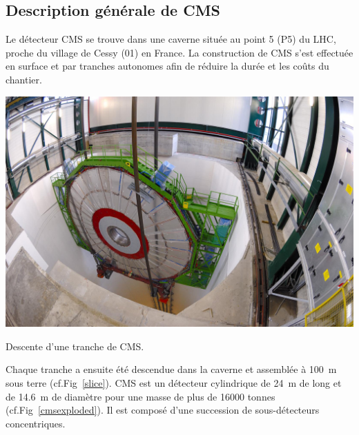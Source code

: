 \subsection{Description générale de CMS}
Le détecteur CMS se trouve dans une caverne située au point \num{5} (P5) du LHC, proche du village de Cessy (01) en France. La construction de CMS s'est effectuée en surface et par tranches autonomes afin de réduire la durée et les coûts du chantier.
\marginpar
{
	\centering
	\includegraphics[width=\marginparwidth]{CMS/slice.jpg}
	\captionsetup{type=figure}\caption{Descente d'une tranche de CMS.}
	\label{slice}
}
Chaque tranche a ensuite été descendue dans la caverne et assemblée à \SI{100}{\meter} sous terre (cf.Fig~\ref{slice}).
CMS est un détecteur cylindrique de \SI{24}{\meter} de long et de \SI{14.6}{\meter} de diamètre pour une masse de plus de \num{16000} tonnes (cf.Fig~\ref{cmsexploded}). Il est composé d'une succession de sous-détecteurs concentriques.

